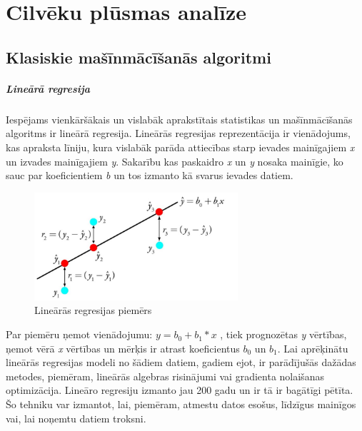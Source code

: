 \chapter{Cilvēku plūsmas analīze}
\section{Klasiskie mašīnmācīšanās algoritmi}
\paragraph{Lineārā regresija}
\hfill\par
Iespējams vienkāršākais un vislabāk aprakstītais statistikas un mašīnmācīšanās algoritms ir lineārā regresija. Lineārās regresijas reprezentācija ir vienādojums, kas apraksta līniju, kura vislabāk parāda attiecības starp ievades mainīgajiem \textit{x} un izvades mainīgajiem \textit{y}. Sakarību kas paskaidro \textit{x} un \textit{y} nosaka mainīgie, ko sauc par koeficientiem \textit{b} un tos izmanto kā svarus ievades datiem.

\begin{figure}[h]%
	\centering
	\includegraphics[height=4cm]{images/linreg.png} %
	\caption{Lineārās regresijas piemērs}%
	\label{fig:example}%
\end{figure} 

Par piemēru ņemot vienādojumu: $ y = b_0 + b_1 * x $ , tiek prognozētas \textit{y} vērtības, ņemot vērā \textit{x} vērtības un mērķis ir atrast koeficientus $b_0$ un $b_1$. Lai aprēķinātu lineārās regresijas modeli no šādiem datiem, gadiem ejot, ir parādījušās dažādas metodes, piemēram, lineārās algebras risinājumi vai gradienta nolaišanas optimizācija. Lineāro regresiju izmanto jau 200 gadu un ir tā ir bagātīgi pētīta. Šo tehniku var izmantot, lai, piemēram, atmestu datos esošus, līdzīgus mainīgos vai, lai noņemtu datiem troksni. 
\newpage
